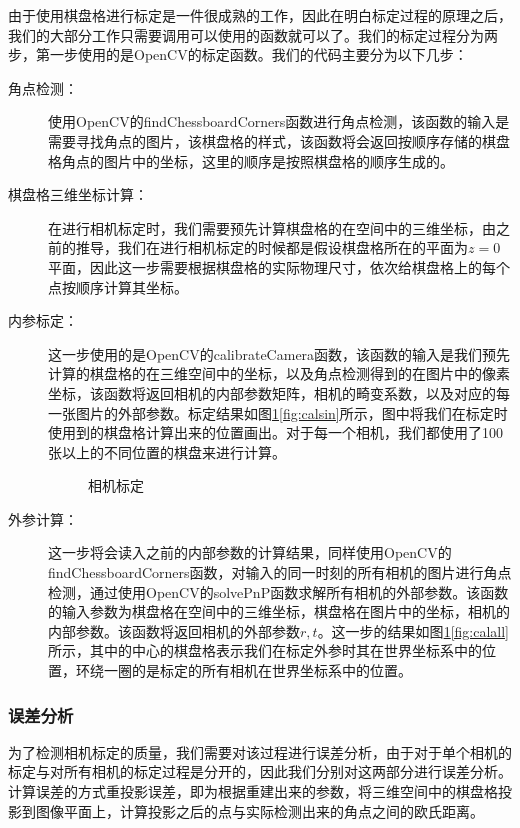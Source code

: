 由于使用棋盘格进行标定是一件很成熟的工作，因此在明白标定过程的原理之后，我们的大部分工作只需要调用可以使用的函数就可以了。我们的标定过程分为两步，第一步使用的是OpenCV的标定函数。我们的代码主要分为以下几步：
\begin{description}
    \item[角点检测：]使用OpenCV的\textrm{findChessboardCorners}函数进行角点检测，该函数的输入是需要寻找角点的图片，该棋盘格的样式，该函数将会返回按顺序存储的棋盘格角点的图片中的坐标，这里的顺序是按照棋盘格的顺序生成的。
    \item[棋盘格三维坐标计算：]在进行相机标定时，我们需要预先计算棋盘格的在空间中的三维坐标，由之前的推导，我们在进行相机标定的时候都是假设棋盘格所在的平面为\(z=0\)平面，因此这一步需要根据棋盘格的实际物理尺寸，依次给棋盘格上的每个点按顺序计算其坐标。
    \item[内参标定：]这一步使用的是OpenCV的\textrm{calibrateCamera}函数，该函数的输入是我们预先计算的棋盘格的在三维空间中的坐标，以及角点检测得到的在图片中的像素坐标，该函数将返回相机的内部参数矩阵，相机的畸变系数，以及对应的每一张图片的外部参数。标定结果如图\ref{fig:calb}\ref{fig:calsin}所示，图中将我们在标定时使用到的棋盘格计算出来的位置画出。对于每一个相机，我们都使用了100张以上的不同位置的棋盘来进行计算。
    \begin{figure}[ht] \centering
        \caption{\label{fig:calb} 相机标定}
    \end{figure} 
    \item[外参计算：]这一步将会读入之前的内部参数的计算结果，同样使用OpenCV的\textrm{findChessboardCorners}函数，对输入的同一时刻的所有相机的图片进行角点检测，通过使用OpenCV的\textrm{solvePnP}函数求解所有相机的外部参数。该函数的输入参数为棋盘格在空间中的三维坐标，棋盘格在图片中的坐标，相机的内部参数。该函数将返回相机的外部参数\(r, t\)。这一步的结果如图\ref{fig:calb}\ref{fig:calall}所示，其中的中心的棋盘格表示我们在标定外参时其在世界坐标系中的位置，环绕一圈的是标定的所有相机在世界坐标系中的位置。
\end{description}

\subsubsection{误差分析}
为了检测相机标定的质量，我们需要对该过程进行误差分析，由于对于单个相机的标定与对所有相机的标定过程是分开的，因此我们分别对这两部分进行误差分析。计算误差的方式重投影误差，即为根据重建出来的参数，将三维空间中的棋盘格投影到图像平面上，计算投影之后的点与实际检测出来的角点之间的欧氏距离。

